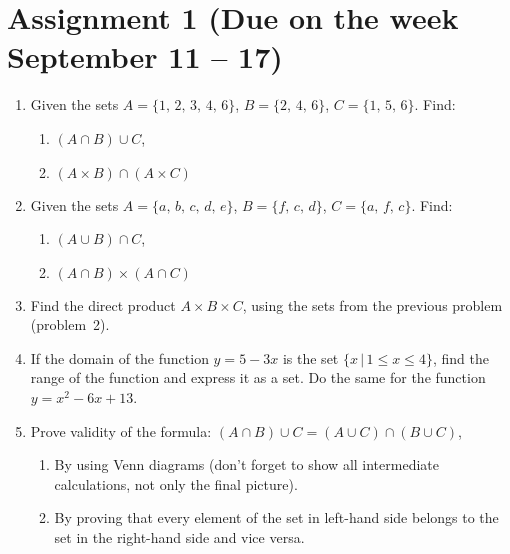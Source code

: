 \documentclass[12pt]{article} %
\theoremstyle{definition} %
\begin{document}
\section*{Assignment 1 (Due on the week September 11 – 17)}

\begin{enumerate}

\item Given the sets $A=\{1,\, 2,\, 3,\, 4,\, 6\}$, $B=\{2,\, 4,\, 6\}$, $C=\{1,\, 5,\, 6\}$.  Find:

	\begin{enumerate}
\item $(A\cap B)\cup C$,
\item $(A\times B)\cap (A\times C)$
\end{enumerate}

\item Given the sets $A=\{a,\, b,\, c,\, d,\, e\}$, $B=\{f,\, c,\, d\}$, $C=\{a,\, f,\, c\}$.  Find:
	\begin{enumerate}
\item $(A\cup B)\cap C$,
\item $(A\cap B)\times (A\cap C)$
\end{enumerate}


\item Find the direct product $A\times B\times C$, using the sets from the previous problem (problem~2).

\item  If the domain of the function $y=5-3x$ is the set $\{x\,|\,1\leq x\leq 4\}$, find the range of the function and express it as a set. Do the same for the function $y=x^2-6x+13$.

\item Prove validity of the formula: $(A\cap B)\cup C=(A\cup C)\cap (B\cup C)$,
\begin{enumerate}
\item By using Venn diagrams (don't forget to show all intermediate calculations, not only the final picture).
\item By proving that every element of the set in left-hand side belongs to the set in the right-hand side and vice versa.
\end{enumerate}

\end{enumerate}
\end{document}
